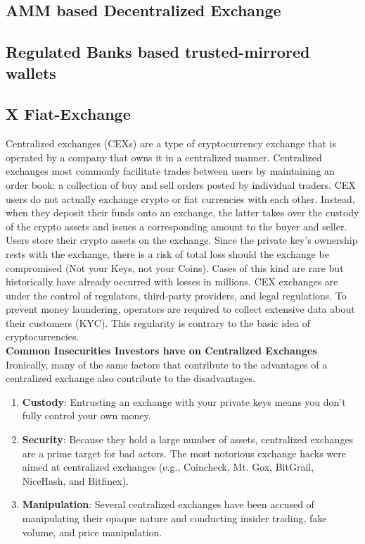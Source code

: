 \documentclass[letterpaper,11pt]{article}
\begin{document}
	
	
	\subsection{AMM based Decentralized Exchange}
	
	\subsection{Regulated Banks based trusted-mirrored wallets}
	

\subsection{X Fiat-Exchange}

Centralized exchanges (CEXs) are a type of cryptocurrency exchange that is operated by a company that owns it in a centralized manner. Centralized exchanges most commonly facilitate trades between users by maintaining an order book: a collection of buy and sell orders posted by individual traders. CEX users do not actually exchange crypto or fiat currencies with each other. Instead, when they deposit their funds onto an exchange, the latter takes over the custody of the crypto assets and issues a corresponding amount to the buyer and seller. Users store their crypto assets on the exchange. Since the private key's ownership rests with the exchange, there is a risk of total loss should the exchange be compromised (Not your Keys, not your Coins). Cases of this kind are rare but historically have already occurred with losses in millions. CEX exchanges are under the control of regulators, third-party providers, and legal regulations. To prevent money laundering, operators are required to collect extensive data about their customers (KYC). This regularity is contrary to the basic idea of cryptocurrencies.\\

\textbf{Common Insecurities Investors have on Centralized Exchanges}\\

Ironically, many of the same factors that contribute to the advantages of a centralized exchange also contribute to the disadvantages.
\begin{enumerate}[wide, labelwidth=!, labelindent=0pt]
\item \textbf{Custody}: Entrusting an exchange with your private keys means you don’t fully control your own money.

\item \textbf{Security}: Because they hold a large number of assets, centralized exchanges are a prime target for bad actors. The most notorious exchange hacks were aimed at centralized exchanges (e.g., Coincheck, Mt. Gox, BitGrail, NiceHash, and Bitfinex).

\item \textbf{Manipulation}: Several centralized exchanges have been accused of manipulating their opaque nature and conducting insider trading, fake volume, and price manipulation.
\end{enumerate}
\end{document}
